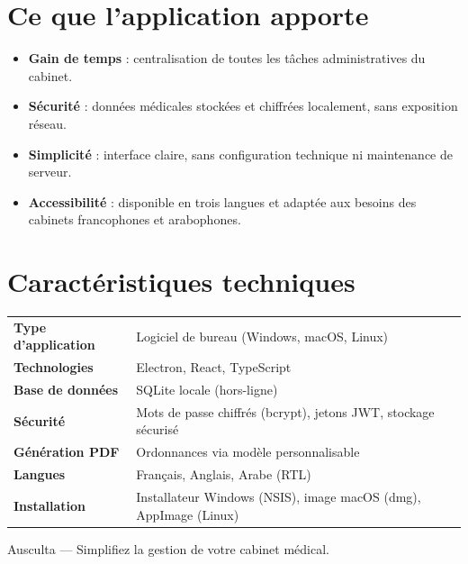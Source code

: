 \documentclass[11pt,a4paper]{article}
\begin{document}
\section{Ce que l'application apporte}
\begin{itemize}
  \item \textbf{Gain de temps} : centralisation de toutes les tâches
        administratives du cabinet.
  \item \textbf{Sécurité} : données médicales stockées et chiffrées
        localement, sans exposition réseau.
  \item \textbf{Simplicité} : interface claire, sans configuration
        technique ni maintenance de serveur.
  \item \textbf{Accessibilité} : disponible en trois langues et adaptée aux
        besoins des cabinets francophones et arabophones.
\end{itemize}

\section{Caractéristiques techniques}

\renewcommand{\arraystretch}{1.4}
\begin{center}
\begin{tabular}{>{\raggedright}p{4.5cm} p{9.5cm}}
\toprule
\textbf{Type d'application} & Logiciel de bureau (Windows, macOS, Linux) \\
\textbf{Technologies} & Electron, React, TypeScript \\
\textbf{Base de données} & SQLite locale (hors-ligne) \\
\textbf{Sécurité} & Mots de passe chiffrés (bcrypt), jetons JWT, stockage sécurisé \\
\textbf{Génération PDF} & Ordonnances via modèle personnalisable \\
\textbf{Langues} & Français, Anglais, Arabe (RTL) \\
\textbf{Installation} & Installateur Windows (NSIS), image macOS (dmg), AppImage (Linux) \\
\bottomrule
\end{tabular}
\end{center}

\vspace{12pt}
\begin{center}
\small\textcolor{primary}{Ausculta — Simplifiez la gestion de votre cabinet médical.}
\end{center}
\end{document}
